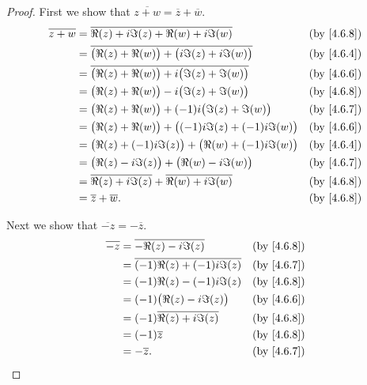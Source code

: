 \begin{proof}
  First we show that \(\overline{z + w} = \overline{z} + \overline{w}\).
  \begin{align*}
    \overline{z + w} & = \overline{\Re(z) + i \Im(z) + \Re(w) + i \Im(w)}                     &  & \text{(by \cref{4.6.8})} \\
                     & = \overline{\big(\Re(z) + \Re(w)\big) + \big(i \Im(z) + i \Im(w)\big)} &  & \text{(by \cref{4.6.4})} \\
                     & = \overline{\big(\Re(z) + \Re(w)\big) + i \big(\Im(z) + \Im(w)\big)}   &  & \text{(by \cref{4.6.6})} \\
                     & = \big(\Re(z) + \Re(w)\big) - i \big(\Im(z) + \Im(w)\big)              &  & \text{(by \cref{4.6.8})} \\
                     & = \big(\Re(z) + \Re(w)\big) + (-1) i \big(\Im(z) + \Im(w)\big)         &  & \text{(by \cref{4.6.7})} \\
                     & = \big(\Re(z) + \Re(w)\big) + \big((-1) i \Im(z) + (-1) i \Im(w)\big)  &  & \text{(by \cref{4.6.6})} \\
                     & = \big(\Re(z) + (-1) i \Im(z)\big) + \big(\Re(w) + (-1) i \Im(w)\big)  &  & \text{(by \cref{4.6.4})} \\
                     & = \big(\Re(z) - i \Im(z)\big) + \big(\Re(w) - i \Im(w)\big)            &  & \text{(by \cref{4.6.7})} \\
                     & = \overline{\Re(z) + i \Im(z)} + \overline{\Re(w) + i \Im(w)}          &  & \text{(by \cref{4.6.8})} \\
                     & = \overline{z} + \overline{w}.                                         &  & \text{(by \cref{4.6.8})}
  \end{align*}

  Next we show that \(\overline{-z} = -\overline{z}\).
  \begin{align*}
    \overline{-z} & = \overline{-\Re(z) - i \Im(z)}          &  & \text{(by \cref{4.6.8})} \\
                  & = \overline{(-1) \Re(z) + (-1) i \Im(z)} &  & \text{(by \cref{4.6.7})} \\
                  & = (-1) \Re(z) - (-1) i \Im(z)            &  & \text{(by \cref{4.6.8})} \\
                  & = (-1) \big(\Re(z) - i \Im(z)\big)       &  & \text{(by \cref{4.6.6})} \\
                  & = (-1) \overline{\Re(z) + i \Im(z)}      &  & \text{(by \cref{4.6.8})} \\
                  & = (-1) \overline{z}                      &  & \text{(by \cref{4.6.8})} \\
                  & = -\overline{z}.                         &  & \text{(by \cref{4.6.7})}
  \end{align*}


\end{proof}

